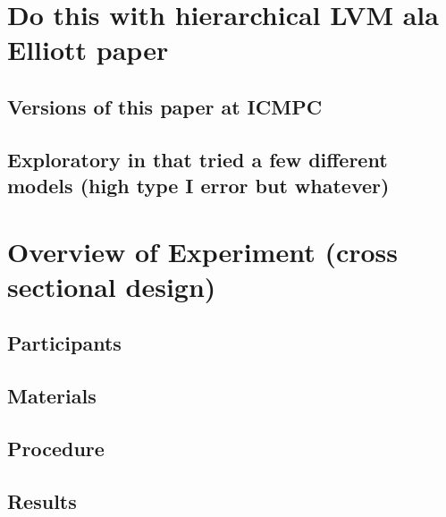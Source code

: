 \documentclass[]{book}
\theoremstyle{definition}
\theoremstyle{definition}
\theoremstyle{definition}
\theoremstyle{remark}
\begin{document}
\hypertarget{do-this-with-hierarchical-lvm-ala-elliott-paper}{%
\section{Do this with hierarchical LVM ala Elliott
paper}\label{do-this-with-hierarchical-lvm-ala-elliott-paper}}

\hypertarget{versions-of-this-paper-at-icmpc}{%
\subsection{Versions of this paper at
ICMPC}\label{versions-of-this-paper-at-icmpc}}

\hypertarget{exploratory-in-that-tried-a-few-different-models-high-type-i-error-but-whatever}{%
\subsection{Exploratory in that tried a few different models (high type
I error but
whatever)}\label{exploratory-in-that-tried-a-few-different-models-high-type-i-error-but-whatever}}

\hypertarget{overview-of-experiment-cross-sectional-design}{%
\section{Overview of Experiment (cross sectional
design)}\label{overview-of-experiment-cross-sectional-design}}

\hypertarget{participants}{%
\subsection{Participants}\label{participants}}

\hypertarget{materials}{%
\subsection{Materials}\label{materials}}

\hypertarget{procedure}{%
\subsection{Procedure}\label{procedure}}

\hypertarget{results}{%
\subsection{Results}\label{results}}
\end{document}

